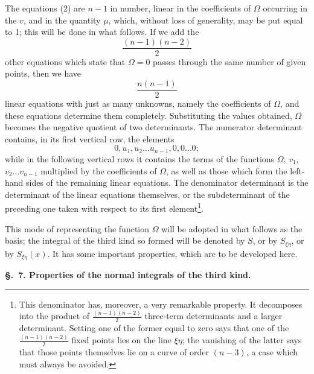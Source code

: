 \documentclass[10pt]{article}
\begin{document}
The equations (2) are $n-1$ in number, linear in the coefficients of $\Omega$ occurring in the $v$, and in the quantity $\mu$, which, without loss of generality, may be put equal to 1; this will be done in what follows. If we add the
\[
\frac{(n-1)(n-2)}{2}
\]
other equations which state that $\Omega=0$ passes through the same number of given points, then we have
\[
\frac{n(n-1)}{2}
\]
linear equations with just as many unknowns, namely the coefficients of $\Omega$, and these equations determine them completely. Substituting the values obtained, $\Omega$ becomes the negative quotient of two determinants. The numerator determinant contains, in its first vertical row, the elements
\[
0, u_1, u_2\ldots u_{n-1}, 0,0\ldots0;
\]
while in the following vertical rows it contains the terms of the functions $\Omega$, $v_1$, $v_2\ldots v_{n-1}$ multiplied by the coefficients of $\Omega$, as well as those which form the left-hand sides of the remaining linear equations. The denominator determinant is the determinant of the linear equations themselves, or the subdeterminant of the preceding one taken with respect to its first element\footnote{This denominator has, moreover, a very remarkable property. It decomposes into the product of $\frac{(n-1)(n-2)}{2}$ three-term determinants and a larger determinant. Setting one of the former equal to zero says that one of the $\frac{(n-1)(n-2)}{2}$ fixed points lies on the line $\xi\eta$; the vanishing of the latter says that those points themselves lie on a curve of order $(n-3)$, a case which must always be avoided.}.

This mode of representing the function $\Omega$ will be adopted in what follows as the basis; the integral of the third kind so formed will be denoted by $S$, or by $S_{\xi\eta}$, or by $S_{\xi\eta}(x)$. It has some important properties, which are to be developed here.

\begin{center}
{\bfseries \S.\ 7. Properties of the normal integrals of the third kind.}
\end{center}
\end{document}
